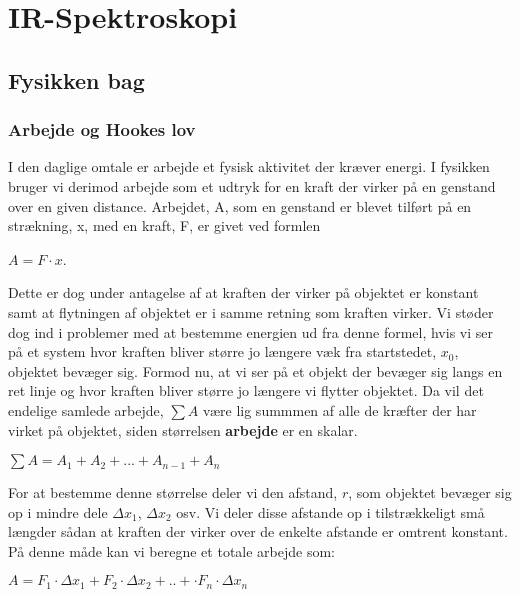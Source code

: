 \chapter{IR-Spektroskopi}

\section{Fysikken bag}
\subsection{Arbejde og Hookes lov}
I den daglige omtale er arbejde et fysisk aktivitet der kræver energi. I fysikken bruger vi derimod arbejde som et udtryk for en kraft der virker på en genstand over en given distance. Arbejdet, A, som en genstand er blevet tilført på en strækning, x, med en kraft, F, er givet ved formlen
\\
\begin{center}
 $A=F \cdot x$. 
\end{center}
\bigskip

Dette er dog under antagelse af at kraften der virker på objektet er konstant samt at flytningen af objektet er i samme retning som kraften virker. 
Vi støder dog ind i problemer med at bestemme energien ud fra denne formel, hvis vi ser på et system hvor kraften bliver større jo længere væk fra startstedet, $x_0$, objektet bevæger sig. Formod nu, at vi ser på et objekt der bevæger sig langs en ret linje og hvor kraften bliver større jo længere vi flytter objektet. Da vil det endelige samlede arbejde, $\sum A$ være lig summmen af alle de kræfter der har virket på objektet, siden størrelsen \textbf{arbejde} er en skalar.
\\
\begin{center}
$\sum A = A_1 + A_2 + ... + A_{n-1} + A_n$
\end{center}
\bigskip

For at bestemme denne størrelse deler vi den afstand, $r$, som objektet bevæger sig op i mindre dele $\Delta x_1$, $\Delta x_2$ osv. Vi deler disse afstande op i tilstrækkeligt små længder sådan at kraften der virker over de enkelte afstande er omtrent konstant. På denne måde kan vi beregne et totale arbejde som:
\\
\begin{center}
$A = F_1 \cdot \Delta x_1 + F_2 \cdot \Delta x_2 + .. + \cdot F_n \cdot \Delta  x_n$
\end{center}
\bigskip

